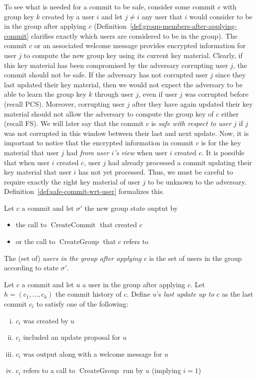 To see what is needed for a commit to be safe, consider some commit $c$ with group key $k$ created by a user $i$ and let $j \neq i$ any user that $i$ would consider to be in the group after applying $c$ (Definition~\ref{def:group-members-after-applying-commit} clarifies exactly which users are considered to be in the group). The commit $c$ or an associated welcome message provides encrypted information for user $j$ to compute the new group key using its current key material. Clearly, if this key material has been compromised by the adversary corrupting user $j$, the commit should not be safe. If the adversary has not corrupted user $j$ since they last updated their key material, then we would not expect the adversary to be able to learn the group key $k$ through user $j$, even if user $j$ was corrupted before (recall PCS).
Moreover, corrupting user $j$ after they have again updated their key material should not allow the adversary to compute the group key of $c$ either (recall FS). We will later say that the commit $c$ is \emph{safe with respect to user $j$} if $j$ was not corrupted in this window between their last and next update.
Now, it is important to notice that the encrypted information in commit $c$ is for the key material that user $j$ had \emph{from user $i$'s view} when user $i$ created $c$. It is possible that when user $i$ created $c$, user $j$ had already processed a commit updating their key material that user $i$ has not yet processed. Thus, we must be careful to require exactly the right key material of user $j$ to be unknown to the adversary. Definition~\vref{def:safe-commit-wrt-user} formalizes this.

\begin{definition} \label{def:group-members-after-applying-commit}
	Let $c$ a commit and let $\sigma'$ the new group state ouptut by
	\begin{itemize}
		\item the call to $\operatorname{CreateCommit}$ that created $c$
		\item or the call to $\operatorname{CreateGroup}$ that $c$ refers to
	\end{itemize}
	The (set of) \emph{users in the group after applying $c$} is the set of users in the group according to state $\sigma'$.
\end{definition}


\begin{definition} \label{def:last-update-before-commit}
	Let $c$ a commit and let $u$ a user in the group after applying $c$. Let $h = (c_1, \ldots, c_k)$ the commit history of $c$. Define $u$'s \emph{last update up to} $c$ as the last commit $c_i$ to satisfy one of the following:
	\begin{enumerate}[(i)]
		\item $c_i$ was created by $u$
		\item $c_i$ included an update proposal for $u$
		\item $c_i$ was output along with a welcome message for $u$
		\item $c_i$ refers to a call to $\operatorname{CreateGroup}$ run by $u$ (implying $i = 1$)
	\end{enumerate}
\end{definition}

